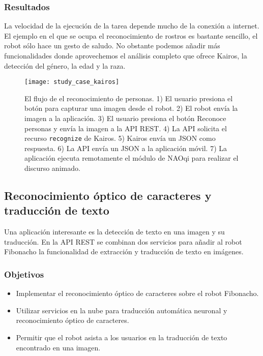 \subsubsection{Resultados}

La velocidad de la ejecución de la tarea
depende mucho de la conexión a internet.
El ejemplo en el que se ocupa el reconocimiento
de rostros es bastante sencillo, el robot
sólo hace un gesto de saludo. No obstante 
podemos añadir más funcionalidades donde
aprovechemos el análisis completo que ofrece
Kairos, la detección del género, la edad y la raza.



\begin{figure}[htbp]
\centering
\texttt{[image: study\_case\_kairos]}
\caption{El flujo de el reconocimiento de personas. 1) El usuario presiona el botón para capturar una imagen desde el robot. 2) El robot envía la imagen a la 
aplicación. 3) El usuario presiona el botón Reconoce personas y envía la imagen a la API REST. 4) La API solicita el recurso \texttt{recognize} de Kairos. 5) Kairos envía un JSON como respuesta. 6) La API 
envía un JSON a la aplicación móvil. 7) La aplicación ejecuta remotamente el módulo de NAOqi para realizar el discurso animado.}
\end{figure}



\subsection{Reconocimiento óptico de caracteres y traducción de texto}

Una aplicación interesante es la
detección de texto en una imagen y su
traducción.
En la API REST se combinan dos servicios
para añadir al robot Fibonacho la funcionalidad de extracción y traducción de texto en imágenes. 


\subsubsection{Objetivos}

\begin{itemize}
    \item Implementar el reconocimiento óptico
    de caracteres sobre el robot Fibonacho.
    \item Utilizar servicios en la nube para traducción
    automática neuronal y reconocimiento óptico de caracteres.
    \item Permitir que el robot asista a los usuarios
    en la traducción de texto encontrado en una imagen.
\end{itemize}


